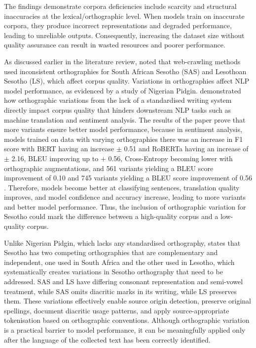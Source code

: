 \documentclass[11pt,a4paper]{article}
\begin{document}
The findings demonstrate corpora deficiencies include scarcity and structural inaccuracies at the lexical/orthographic level. When models train on inaccurate corpora, they produce incorrect representations and degraded performance, leading to unreliable outputs. Consequently, increasing the dataset size without quality assurance can result in wasted resources and poorer performance. 
\vspace{2em}

As discussed earlier in the literature review, \citet{Sibeko2024} noted that web-crawling methods used inconsistent orthographies for South African Sesotho (SAS) and Lesothoan Sesotho (LS), which affect corpus quality. Variations in orthographies affect NLP model performance, as evidenced by a study of Nigerian Pidgin. \citet{lin-etal-2024-modeling} demonstrated how orthographic variations from the lack of a standardised writing system directly impact corpus quality that hinders downstream NLP tasks such as machine translation and sentiment analysis. The results of the paper prove that more variants ensure better model performance, because in sentiment analysis, models trained on data with varying orthographies there was an increase in F1 score with BERT having an increase  $\pm$ 0.51 and RoBERTa having an increase of $\pm$ 2.16, BLEU improving up to $+$ 0.56, Cross-Entropy becoming lower with orthographic augmentations, and 561 variants yielding a BLEU score improvement of  0.10 and 745 variants yielding a BLEU score improvement of 0.56 \citep{lin-etal-2024-modeling}. Therefore, models become better at classifying sentences, translation quality improves, and model confidence and accuracy increase, leading to more variants and better model performance. Thus, the inclusion of orthographic variation for Sesotho could mark the difference between a high-quality corpus and a low-quality corpus. 

Unlike Nigerian Pidgin, which lacks any standardised orthography, \citet{Makutoane2022} states that Sesotho has two competing orthographies that are complementary and independent, one used in South Africa and the other used in Lesotho, which systematically creates variations in Sesotho orthography that need to be addressed. SAS and LS have differing consonant representation and semi-vowel treatment, while SAS omits diacritic marks in its writing, while LS preserves them. These variations effectively enable source origin detection, preserve original spellings, document diacritic usage patterns, and apply source-appropriate tokenisation based on orthographic conventions. Although orthographic variation is a practical barrier to model performance, it can be meaningfully applied only after the language of the collected text has been correctly identified. 
\vspace{1em}
\end{document}
